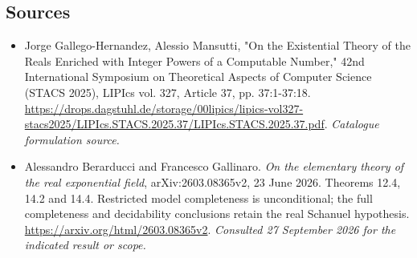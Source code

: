 \documentclass[11pt,a4paper]{article}
\numberwithin{equation}{section}
\begin{document}
\subsection{Sources}
\begin{itemize}\raggedright
\item[\textnormal{[S1]}]\hypertarget{source:124:1}{} Jorge Gallego-Hernandez, Alessio Mansutti, "On the Existential Theory of the Reals Enriched with Integer Powers of a Computable Number," 42nd International Symposium on Theoretical Aspects of Computer Science (STACS 2025), LIPIcs vol. 327, Article 37, pp. 37:1-37:18.
\url{https://drops.dagstuhl.de/storage/00lipics/lipics-vol327-stacs2025/LIPIcs.STACS.2025.37/LIPIcs.STACS.2025.37.pdf}.
{\small\textit{Catalogue formulation source.}}
\item[\textnormal{[E1]}]\hypertarget{extra:124:1}{} Alessandro Berarducci and Francesco Gallinaro.
\emph{On the elementary theory of the real exponential field}, arXiv:2603.08365v2, 23 June 2026. Theorems 12.4, 14.2 and 14.4. Restricted model completeness is unconditional; the full completeness and decidability conclusions retain the real Schanuel hypothesis.
\url{https://arxiv.org/html/2603.08365v2}.
{\small\textit{Consulted 27 September 2026 for the indicated result or scope.}}
\end{itemize}
\end{document}
